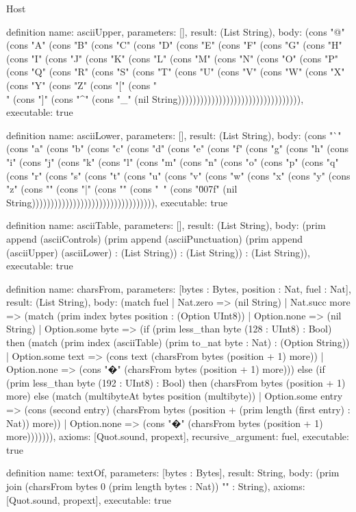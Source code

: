 \begin{lexlean}{Host}
\begin{semanticmodule}
definition{
  name: asciiUpper,
  parameters: [],
  result: (List String),
  body: (cons "@" (cons "A" (cons "B" (cons "C" (cons "D" (cons "E" (cons "F" (cons "G" (cons "H" (cons "I" (cons "J" (cons "K" (cons "L" (cons "M" (cons "N" (cons "O" (cons "P" (cons "Q" (cons "R" (cons "S" (cons "T" (cons "U" (cons "V" (cons "W" (cons "X" (cons "Y" (cons "Z" (cons "[" (cons "\\" (cons "]" (cons "^" (cons "_" (nil String))))))))))))))))))))))))))))))))),
  executable: true
}

definition{
  name: asciiLower,
  parameters: [],
  result: (List String),
  body: (cons "`" (cons "a" (cons "b" (cons "c" (cons "d" (cons "e" (cons "f" (cons "g" (cons "h" (cons "i" (cons "j" (cons "k" (cons "l" (cons "m" (cons "n" (cons "o" (cons "p" (cons "q" (cons "r" (cons "s" (cons "t" (cons "u" (cons "v" (cons "w" (cons "x" (cons "y" (cons "z" (cons "{" (cons "|" (cons "}" (cons "~" (cons "\u007f" (nil String))))))))))))))))))))))))))))))))),
  executable: true
}

definition{
  name: asciiTable,
  parameters: [],
  result: (List String),
  body: (prim append (asciiControls) (prim append (asciiPunctuation) (prim append (asciiUpper) (asciiLower) : (List String)) : (List String)) : (List String)),
  executable: true
}

definition{
  name: charsFrom,
  parameters: [bytes : Bytes, position : Nat, fuel : Nat],
  result: (List String),
  body: (match fuel
    | Nat.zero => (nil String)
    | Nat.succ more => (match (prim index bytes position : (Option UInt8))
      | Option.none => (nil String)
      | Option.some byte => (if (prim less_than byte (128 : UInt8) : Bool) then (match (prim index (asciiTable) (prim to_nat byte : Nat) : (Option String))
        | Option.some text => (cons text (charsFrom bytes (position + 1) more))
        | Option.none => (cons "�" (charsFrom bytes (position + 1) more))) else (if (prim less_than byte (192 : UInt8) : Bool) then (charsFrom bytes (position + 1) more) else (match (multibyteAt bytes position (multibyte))
        | Option.some entry => (cons (second entry) (charsFrom bytes (position + (prim length (first entry) : Nat)) more))
        | Option.none => (cons "�" (charsFrom bytes (position + 1) more))))))),
  axioms: [Quot.sound, propext],
  recursive_argument: fuel,
  executable: true
}

definition{
  name: textOf,
  parameters: [bytes : Bytes],
  result: String,
  body: (prim join (charsFrom bytes 0 (prim length bytes : Nat)) "" : String),
  axioms: [Quot.sound, propext],
  executable: true
}


\end{semanticmodule}
\end{lexlean}

